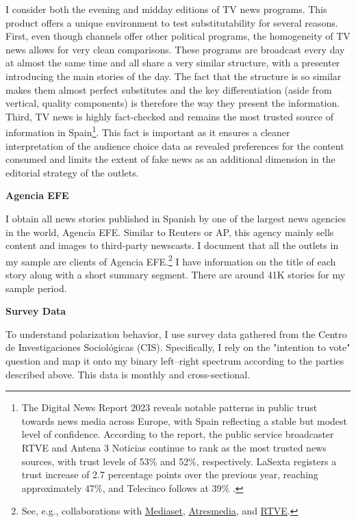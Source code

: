 \documentclass[12pt]{article}
\begin{document}
	I consider both the evening and midday editions of TV news programs. This product offers a unique environment to test substitutability for several reasons. First, even though channels offer other political programs, the homogeneity of TV news allows for very clean comparisons. These programs are broadcast every day at almost the same time and all share a very similar structure, with a presenter introducing the main stories of the day. The fact that the structure is so similar makes them almost perfect substitutes and the key differentiation (aside from vertical, quality components) is therefore the way they present the information. Third, TV news is highly fact-checked and remains the most trusted source of information in Spain\footnote{The Digital News Report 2023 reveals notable patterns in public trust towards news media across Europe, with Spain reflecting a stable but modest level of confidence. According to the report, the public service broadcaster RTVE and Antena 3 Noticias continue to rank as the most trusted news sources, with trust levels of 53\% and 52\%, respectively. LaSexta registers a trust increase of 2.7 percentage points over the previous year, reaching approximately 47\%, and Telecinco follows at 39\% \citep{reuters_dnr_2023}.}. This fact is important as it ensures a cleaner interpretation of the audience choice data as revealed preferences for the content consumed and limits the extent of fake news as an additional dimension in the editorial strategy of the outlets. 
	
	\textbf{Agencia EFE}
	
	I obtain all news stories published in Spanish by one of the largest news agencies in the world, Agencia EFE. Similar to Reuters or AP, this agency mainly sells content and images to third-party newscasts. I document that all the outlets in my sample are clients of Agencia EFE.\footnote{See, e.g., collaborations with \href{https://www.telecinco.es/autores/agencia-efe/}{Mediaset}, \href{https://cadenaser.com/nacional/2024/09/22/el-teletexto-una-herramienta-olvidada-que-aun-perdura-en-nuestras-televisiones-cadena-ser/}{Atresmedia}, and \href{https://www.rtve.es/rtve/20130301/rtve-agencia-efe-firman-convenio-colaboracion/611440.shtml}{RTVE}.} I have information on the title of each story along with a short summary segment. There are around 41K stories for my sample period.
	
	\textbf{Survey Data}
	
	To understand polarization behavior, I use survey data gathered from the Centro de Investigaciones Sociológicas (CIS). Specifically, I rely on the "intention to vote" question and map it onto my binary left–right spectrum according to the parties described above. This data is monthly and cross-sectional.
	
\end{document}

